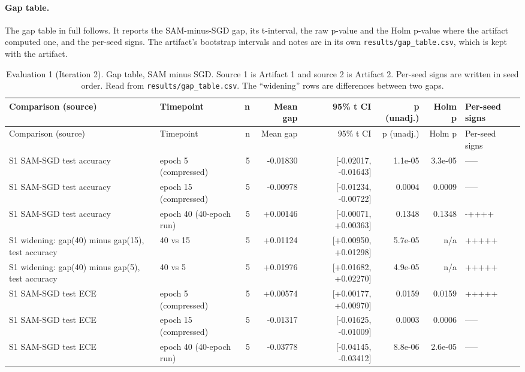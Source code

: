 \documentclass[11pt,letterpaper]{article}
\begin{document}
\paragraph{Gap table.} The gap table in full follows. It reports the SAM-minus-SGD gap, its t-interval, the raw p-value and the Holm p-value where the artifact computed one, and the per-seed signs. The artifact's bootstrap intervals and notes are in its own \texttt{results/gap\_table.csv}, which is kept with the artifact.

{\scriptsize\setlength{\tabcolsep}{2pt}\begin{longtable}{>{\raggedright\arraybackslash}p{3.6cm}lrrrrrl}
\caption{Evaluation 1 (Iteration 2). Gap table, SAM minus SGD. Source 1 is Artifact 1 and source 2 is Artifact 2. Per-seed signs are written in seed order. Read from \texttt{results/gap\_table.csv}. The ``widening'' rows are differences between two gaps.} \label{tab:gap} \\
\toprule
Comparison (source) & Timepoint & n & Mean gap & 95\% t CI & p (unadj.) & Holm p & Per-seed signs \\
\midrule
\endfirsthead
\toprule
Comparison (source) & Timepoint & n & Mean gap & 95\% t CI & p (unadj.) & Holm p & Per-seed signs \\
\midrule
\endhead
\bottomrule
\endfoot
S1 SAM-SGD test accuracy & epoch 5 (compressed) & 5 & -0.01830 & [-0.02017, -0.01643] & 1.1e-05 & 3.3e-05 & ----- \\
S1 SAM-SGD test accuracy & epoch 15 (compressed) & 5 & -0.00978 & [-0.01234, -0.00722] & 0.0004 & 0.0009 & ----- \\
S1 SAM-SGD test accuracy & epoch 40 (40-epoch run) & 5 & +0.00146 & [-0.00071, +0.00363] & 0.1348 & 0.1348 & -++++ \\
S1 widening: gap(40) minus gap(15), test accuracy & 40 vs 15 & 5 & +0.01124 & [+0.00950, +0.01298] & 5.7e-05 & n/a & +++++ \\
S1 widening: gap(40) minus gap(5), test accuracy & 40 vs 5 & 5 & +0.01976 & [+0.01682, +0.02270] & 4.9e-05 & n/a & +++++ \\
S1 SAM-SGD test ECE & epoch 5 (compressed) & 5 & +0.00574 & [+0.00177, +0.00970] & 0.0159 & 0.0159 & +++++ \\
S1 SAM-SGD test ECE & epoch 15 (compressed) & 5 & -0.01317 & [-0.01625, -0.01009] & 0.0003 & 0.0006 & ----- \\
S1 SAM-SGD test ECE & epoch 40 (40-epoch run) & 5 & -0.03778 & [-0.04145, -0.03412] & 8.8e-06 & 2.6e-05 & ----- \\

\end{longtable}}
\end{document}
